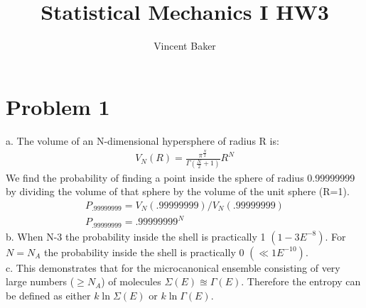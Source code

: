 \documentclass[a4paper,10pt]{article}
\title{Statistical Mechanics I HW3}
\author{Vincent Baker}
\numberwithin{equation}{section}
\begin{document}
\maketitle

\section{Problem 1}
a. The volume of an N-dimensional hypersphere of radius R is:
\begin{gather}
 V_N(R)=\frac{\pi^{\frac{N}{2}}}{\Gamma(\frac{N}{2}+1)}R^N
\end{gather}
We find the probability of finding a point inside the sphere of radius 0.99999999 by dividing the volume of that sphere by the volume of the unit sphere (R=1).
\begin{gather}
 P_{.99999999}= V_N(.99999999)/V_N(.99999999)\\
 P_{.99999999}= .99999999^N
\end{gather}
b. When N-3 the probability inside the shell is practically 1 $(1-3E^{-8})$.
For $N=N_A$ the probability inside the shell is practically 0 $(\ll 1E^{-10})$.
\\
c. This demonstrates that for the microcanonical ensemble consisting of very large numbers ($\ge N_A$) of molecules $\Sigma (E) \approxeq \Gamma (E)$.
Therefore the entropy can be defined as either $k \ln{\Sigma (E)}$ or $k \ln{\Gamma (E)}$.
\end{document}
